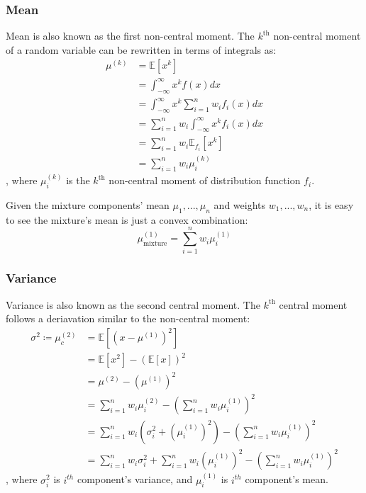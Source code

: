 \subsubsection*{Mean}
Mean is also known as the first non-central moment. 
The $k^\text{th}$ non-central moment of a random variable can be rewritten in terms of integrals as:
\begin{align}
    \mu^{(k)} &= \mathbb{E}[x^k] \\
              &= \int_{-\infty}^{\infty} x^k f(x) dx \\
              &= \int_{-\infty}^{\infty} x^k \sum^n_{i=1} w_i f_i(x) dx \\
              &= \sum^n_{i=1} w_i \int_{-\infty}^{\infty} x^k f_i(x) dx \\
              &= \sum^n_{i=1} w_i \mathbb{E}_{f_i}[x^k] \\
              &= \sum^n_{i=1} w_i \mu_i^{(k)}
\end{align}
, where $\mu_i^{(k)}$ is the $k^\text{th}$ non-central moment of distribution function $f_i$.

Given the mixture components' mean ${\mu_1, ..., \mu_n}$ and weights ${w_1,...,w_n}$,
it is easy to see the mixture's mean is just a convex combination:
\[
    \mu^{(1)}_\text{mixture} = \sum^n_{i=1} w_i \mu^{(1)}_i
\]



\subsubsection*{Variance}
Variance is also known as the second central moment. The $k^\text{th}$ central moment 
follows a deriavation similar to the non-central moment:
\begin{align}
    \sigma^2 \coloneqq \mu^{(2)}_c &= \mathbb{E}[(x-\mu^{(1)})^{2}] \\
        &= \mathbb{E}[x^2] - (\mathbb{E}[x])^2 \\
        &= \mu^{(2)} - (\mu^{(1)})^2 \\
        &= \sum^n_{i=1} w_i \mu^{(2)}_i - \left(\sum^n_{i=1} w_i \mu^{(1)}_i \right)^2  \\
        &= \sum^n_{i=1} w_i \left( \sigma^2_i + (\mu^{(1)}_i)^2 \right) - \left(\sum^n_{i=1} w_i \mu^{(1)}_i \right)^2  \\
        &= \sum^n_{i=1} w_i \sigma^2_i + \sum^n_{i=1} w_i (\mu^{(1)}_i)^2 - \left(\sum^n_{i=1} w_i \mu^{(1)}_i \right)^2 
\end{align}
, where $\sigma_i^2$ is $i^{th}$ component's variance, and $\mu^{(1)}_i$ is $i^{th}$ component's mean.

